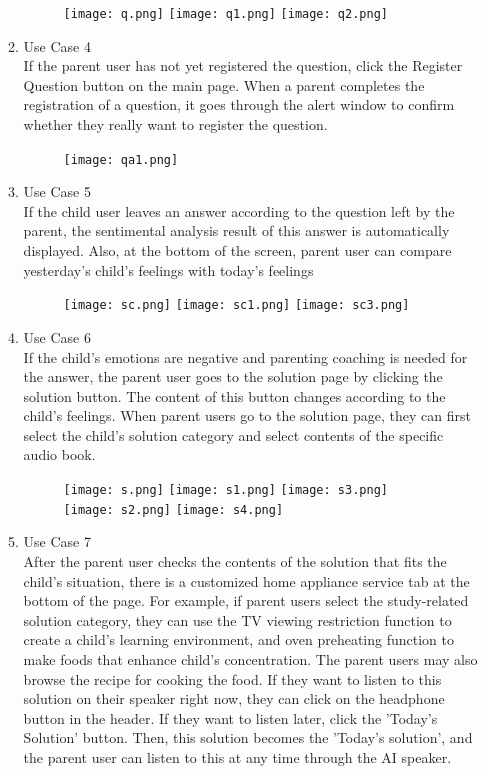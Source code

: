 \documentclass[conference]{IEEEtran}
\begin{document}
\begin{enumerate}
\begin{enumerate}
        \begin{figure}[H]
        \centering
        \texttt{[image: q.png]}
        \texttt{[image: q1.png]}
        \texttt{[image: q2.png]}
        \end{figure}
        \item Use Case 4
        \\If the parent user has not yet registered the question, click the Register Question button on the main page. When a parent completes the registration of a question, it goes through the alert window to confirm whether they really want to register the question.
        \begin{figure}[H]
        \centering
        \texttt{[image: qa1.png]}
        \end{figure}
        \item Use Case 5
        \\If the child user leaves an answer according to the question left by the parent, the sentimental analysis result of this answer is automatically displayed. Also, at the bottom of the screen, parent user can compare yesterday's child's feelings with today's feelings
        \begin{figure}[H]
        \centering
        \texttt{[image: sc.png]}
        \texttt{[image: sc1.png]}
        \texttt{[image: sc3.png]}
        \end{figure}
        \item Use Case 6
        \\If the child's emotions are negative and parenting coaching is needed for the answer, the parent user goes to the solution page by clicking the solution button. The content of this button changes according to the child's feelings. When parent users go to the solution page, they can first select the child's solution category and select contents of the specific audio book.
        \begin{figure}[H]
        \centering
        \texttt{[image: s.png]}
        \texttt{[image: s1.png]}
        \texttt{[image: s3.png]}
        \texttt{[image: s2.png]}
        \texttt{[image: s4.png]}
        \end{figure}
        \item Use Case 7
        \\After the parent user checks the contents of the solution that fits the child's situation, there is a customized home appliance service tab at the bottom of the page. For example, if parent users select the study-related solution category, they can use the TV viewing restriction function to create a child's learning environment, and oven preheating function to make foods that enhance child’s concentration. The parent users may also browse the recipe for cooking the food. If they want to listen to this solution on their speaker right now, they can click on the headphone button in the header. If they want to listen later, click the 'Today’s Solution' button. Then, this solution becomes the 'Today’s solution', and the parent user can listen to this at any time through the AI speaker.

\end{enumerate}
\end{enumerate}
\end{document}
